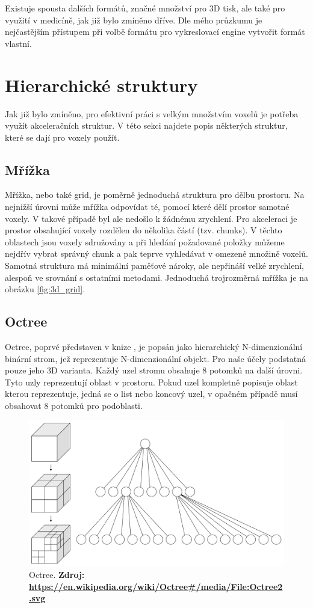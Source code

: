 Existuje spousta dalších formátů, značné množství pro 3D tisk, ale také pro využití v medicíně, jak již bylo zmíněno dříve. Dle mého průzkumu je nejčastějším přístupem při volbě formátu pro vykreslovací engine vytvořit formát vlastní.


\section{Hierarchické struktury}
Jak již bylo zmíněno, pro efektivní práci s velkým množstvím voxelů je potřeba využít akceleračních struktur. V této sekci najdete popis některých struktur, které se dají pro voxely použít.

\subsection{Mřížka}
Mřížka, nebo také grid, je poměrně jednoduchá struktura pro dělbu prostoru. Na nejnižší úrovni může mřížka odpovídat té, pomocí které dělí prostor samotné voxely. V takové případě byl ale nedošlo k žádnému zrychlení. Pro akceleraci je prostor obsahující voxely rozdělen do několika částí (tzv. chunks). V těchto oblastech jsou voxely sdružovány a při hledání požadované položky můžeme nejdřív vybrat správný chunk a pak teprve vyhledávat v omezené množině voxelů. Samotná struktura má minimální paměťové nároky, ale nepřináší velké zrychlení, alespoň ve srovnání s ostatními metodami. Jednoduchá trojrozměrná mřížka je na obrázku \ref{fig:3d_grid}.

\subsection{Octree}
Octree, poprvé představen v knize \cite{rensselaer1980octree}, je popsán jako hierarchický N-dimenzionální binární strom, jež reprezentuje N-dimenzionální objekt. Pro naše účely podstatná pouze jeho 3D varianta. Každý uzel stromu obsahuje 8 potomků na další úrovni. Tyto uzly reprezentují oblast v prostoru. Pokud uzel kompletně popisuje oblast kterou reprezentuje, jedná se o list nebo koncový uzel, v opačném případě musí obsahovat 8 potomků pro podoblasti. 

\begin{figure}[H]
	\centering
	\includegraphics[scale=0.1]{obrazky-figures/Octree2.pdf}
	\caption{Octree. \textbf{Zdroj: \url{https://en.wikipedia.org/wiki/Octree#/media/File:Octree2.svg}}}
	\label{fig:slabs}
\end{figure}

